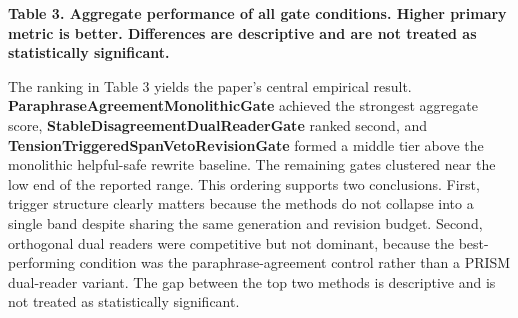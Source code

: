 \documentclass{article}
\begin{document}
\textbf{Table 3. Aggregate performance of all gate conditions. Higher primary metric is better. Differences are descriptive and are not treated as statistically significant.}

\begin{table}[ht]
\centering
\caption{Performance comparison of different methods on Primary metric mean, Entry std, Condition std, Logged entries}
\label{tab:3}
\end{table}

The ranking in Table 3 yields the paper's central empirical result. \textbf{ParaphraseAgreementMonolithicGate} achieved the strongest aggregate score, \textbf{StableDisagreementDualReaderGate} ranked second, and \textbf{TensionTriggeredSpanVetoRevisionGate} formed a middle tier above the monolithic helpful-safe rewrite baseline. The remaining gates clustered near the low end of the reported range. This ordering supports two conclusions. First, trigger structure clearly matters because the methods do not collapse into a single band despite sharing the same generation and revision budget. Second, orthogonal dual readers were competitive but not dominant, because the best-performing condition was the paraphrase-agreement control rather than a PRISM dual-reader variant. The gap between the top two methods is descriptive and is not treated as statistically significant.
\end{document}
